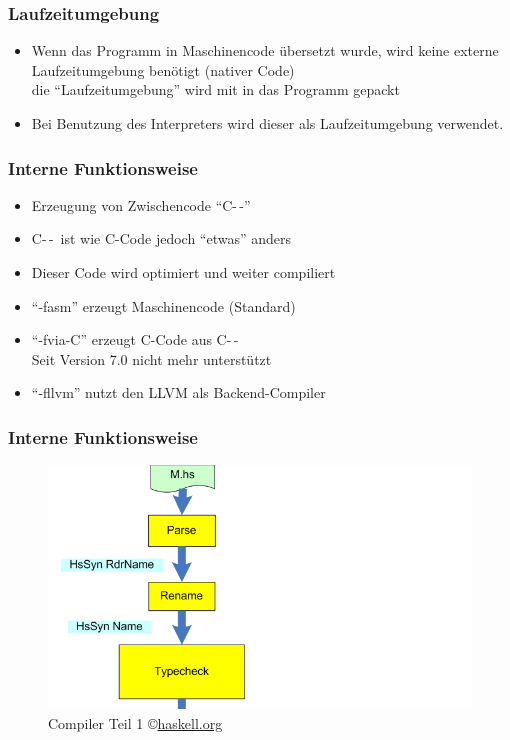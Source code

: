 \documentclass[fleqn,11pt,aspectratio=43]{beamer}
\begin{document}
\begin{frame}
\frametitle{Laufzeitumgebung}
\begin{block}{\vspace*{-2ex}}
\begin{itemize}
  \item Wenn das Programm in Maschinencode übersetzt wurde, wird keine externe Laufzeitumgebung benötigt (nativer Code)\\
  		die "`Laufzeitumgebung"' wird mit in das Programm gepackt
  \item Bei Benutzung des Interpreters wird dieser als Laufzeitumgebung verwendet.
\end{itemize}
\end{block}
\end{frame}

\begin{frame}
\frametitle{Interne Funktionsweise}
\begin{block}{\vspace*{-2ex}}
\begin{itemize}
  \item Erzeugung von Zwischencode "`C-\,-"'
  \item C-\,-\  ist wie C-Code jedoch "`etwas"' anders
  \item Dieser Code wird optimiert und weiter compiliert
  \item "`-fasm"' erzeugt Maschinencode (Standard)
  \item "`-fvia-C"' erzeugt C-Code aus C-\,-\ \\
  		Seit Version 7.0 nicht mehr unterstützt
  \item "`-fllvm"' nutzt den LLVM als Backend-Compiler
\end{itemize}
\end{block}
\end{frame}

\begin{frame}
\frametitle{Interne Funktionsweise}
\begin{figure}
\centering
\includegraphics*[scale=0.4]{images/HscPipe2_1}
\caption{Compiler Teil 1 \copyright \url{haskell.org}}
\end{figure}
\end{frame}
\end{document}
